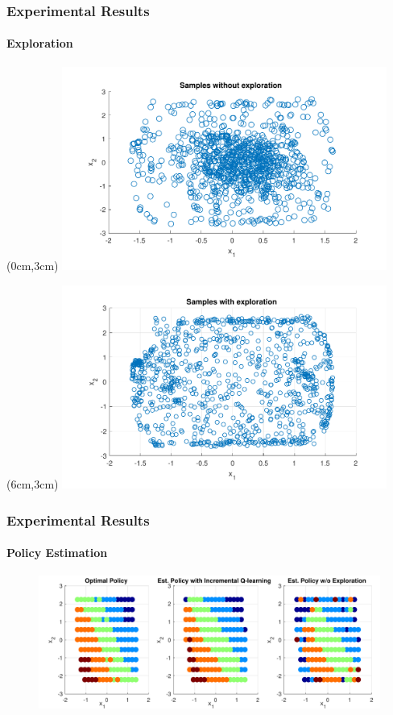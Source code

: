 \documentclass[t]{beamer}
\begin{document}
\begin{frame}
\frametitle{Experimental Results}
\framesubtitle{Exploration}

\begin{textblock*}{8cm}(0cm,3cm) %
\includegraphics[width=0.8\textwidth]{Unexploration_samples}
\end{textblock*}
\begin{textblock*}{8cm}(6cm,3cm) %
\includegraphics[width=0.8\textwidth]{Exploration_samples}
\end{textblock*}
\end{frame}



\begin{frame}
\frametitle{Experimental Results}
\framesubtitle{Policy Estimation}

\begin{figure}
\includegraphics[width=0.8\paperwidth]{Policy}
\end{figure}
\end{frame}
\end{document}
